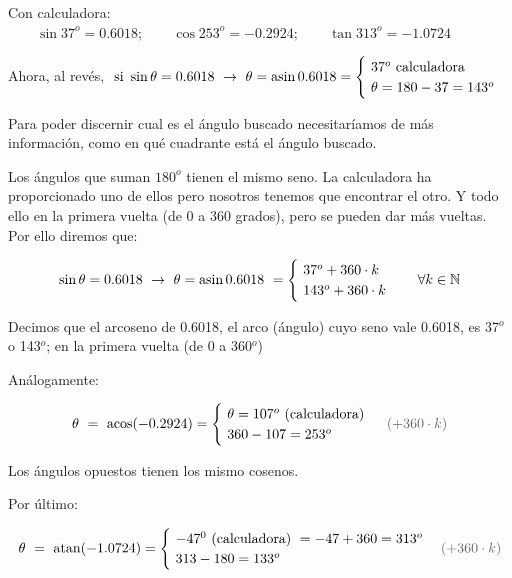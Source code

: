 \begin{miejemplo}

Con calculadora:   $\qquad \sin 37^o=0.6018 ;\qquad \cos 253^o=-0.2924 ;\qquad \tan 313^o=-1.0724$	

\vspace{2mm} Ahora, al revés,$\ \text{ si } \sin \theta=0.6018 \ \to \ \theta= \asin 0.6018=\begin{cases}\ 37^o \text{ calculadora} \\ \ \theta=180-37=143^o \end{cases}$

\vspace{2mm} Para poder discernir cual es el ángulo buscado necesitaríamos de más información, como en qué cuadrante está el ángulo buscado.

\vspace{2mm} Los ángulos que suman $180^o$ tienen el mismo seno. La calculadora ha proporcionado uno de ellos pero nosotros tenemos que encontrar el otro. Y todo ello en la primera vuelta (de 0 a 360 grados), pero se pueden dar más vueltas. Por ello diremos que:

$$\sin \theta = 0.6018 \ \to \ \theta = \asin 0.6018 \ = \begin{cases} \ 37^o + 360\cdot k \ \\ \ 143^o+360\cdot k \end{cases} \quad \forall k\in \mathbb N$$

Decimos que el arcoseno de 0.6018, el arco (ángulo) cuyo seno vale 0.6018, es 37$^o$ o 143$^o$; en la primera vuelta (de 0 a 360$^o$)

\vspace{2mm} Análogamente:

$$\theta\ = \ \acos (-0.2924) = \begin{cases} \ \theta=107^o \text{\ (calculadora)} \\ \ 360-107=253^o \end{cases} \ \textcolor{gris}{(+360\cdot k)}$$

Los ángulos opuestos tienen los mismo cosenos.

\vspace{2mm} Por último:

$$\theta\ = \ \atan (-1.0724)= \begin{cases} \ -47^0 \text{ (calculadora) }=-47+360=313^o  \\ \ 313-180=133^o \end{cases}  \textcolor{gris}{(+360\cdot k)}$$


\end{miejemplo}
